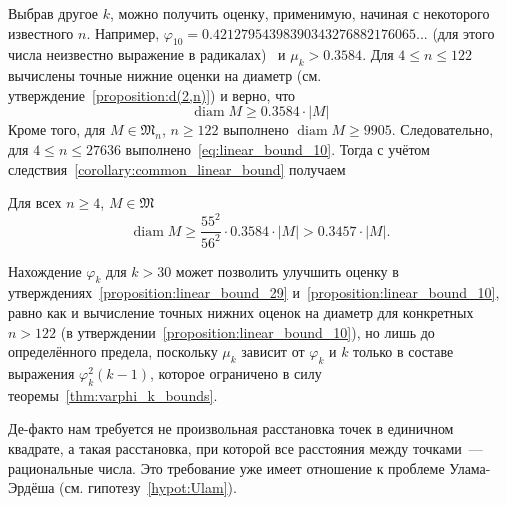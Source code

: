 Выбрав другое $k$, можно получить оценку, применимую, начиная с некоторого известного $n$.
Например, $\varphi_{10} = 0.42127954398390343276882176065...$
(для этого числа неизвестно выражение в радикалах)~\cite{degroot1990optimal10points} и
$\mu_k > 0.3584$.
Для $4 \leq n \leq 122$ вычислены точные нижние оценки на диаметр (см. утверждение~\ref{proposition:d(2,n)}) и верно, что
\begin{equation}
	\label{eq:linear_bound_10}
	\operatorname{diam} M \geq 0.3584 \cdot |M|
\end{equation}
Кроме того, для $M \in \mathfrak{M}_n$, $n \geq 122$ выполнено
$\operatorname{diam} M \geq 9905$.
Следовательно, для $4 \leq n \leq 27636$ выполнено~\eqref{eq:linear_bound_10}.
Тогда с учётом следствия~\ref{corollary:common_linear_bound} получаем
\begin{proposition}
	\label{proposition:linear_bound_10}
	Для всех $n \geq 4$, $M\in\mathfrak{M}$
	\begin{equation*}
		\operatorname{diam} M \geq \frac{55^2}{56^2} \cdot 0.3584 \cdot |M|
		>
		0.3457 \cdot |M|
		.
	\end{equation*}
\end{proposition}

\begin{remark}
	Нахождение $\varphi_k$ для $k > 30$ может позволить улучшить оценку
	в утверждениях~\ref{proposition:linear_bound_29} и~\ref{proposition:linear_bound_10},
	равно как и вычисление точных нижних оценок на диаметр для конкретных $n>122$ (в утверждении~\ref{proposition:linear_bound_10}),
	но лишь до определённого предела, поскольку $\mu_k$ зависит от $\varphi_k$ и $k$
	только в составе выражения $\varphi_k^2 (k-1)$,
	которое ограничено в силу теоремы~\ref{thm:varphi_k_bounds}.
\end{remark}

\begin{remark}
	Де-факто нам требуется не произвольная расстановка точек в единичном квадрате,
	а такая расстановка, при которой все расстояния между точками~--- рациональные числа.
	Это требование уже имеет отношение к проблеме Улама-Эрдёша (см. гипотезу~\ref{hypot:Ulam}).
\end{remark}
